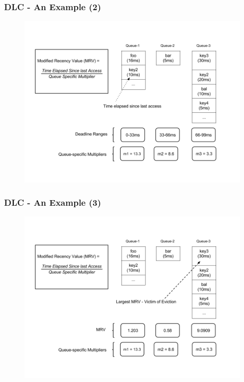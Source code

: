 \documentclass{beamer}
\begin{document}
\begin{frame}
  \frametitle{DLC - An Example (2)}
  \begin{figure}
    \begin{center}
      \centerline{\includegraphics[scale=0.33]{img/DLC3.png}}
    \end{center}
  \end{figure}
\end{frame}

\begin{frame}
  \frametitle{DLC - An Example (3)}
  \begin{figure}
    \begin{center}
      \centerline{\includegraphics[scale=0.33]{img/DLC4.png}}
    \end{center}
  \end{figure}
\end{frame}
\end{document}
